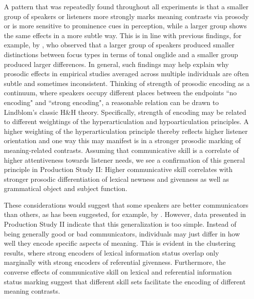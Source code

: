 A pattern that was repeatedly found throughout all experiments is that a smaller group of speakers or listeners more strongly marks meaning contrasts via prosody or is more sensitive to prominence cues in perception, while a larger group shows the same effects in a more subtle way. This is in line with previous findings, for example, by \citet{roessigDynamicsIntonationCategorical2019}, who observed that a larger group of speakers produced smaller distinctions between focus types in terms of tonal onglide and a smaller group produced larger differences. In general, such findings may help explain why prosodic effects in empirical studies averaged across multiple individuals are often subtle and sometimes inconsistent. Thinking of strength of prosodic encoding as a continuum, where speakers occupy different places between the endpoints ``no encoding" and ``strong encoding", a reasonable relation can be drawn to Lindblom's \citeyearpar{lindblomExplainingPhoneticVariation1990} classic H\&H theory. Specifically, strength of encoding may be related to different weightings of the hyperarticulation and hypoarticulation principles. A higher weighting of the hyperarticulation principle thereby reflects higher listener orientation \citep{turnbullListenerorientedPhoneticReduction2019} and one way this may manifest is in a stronger prosodic marking of meaning-related contrasts. Assuming that communicative skill is a correlate of higher attentiveness towards listener needs, we see a confirmation of this general principle in Production Study II: Higher communicative skill correlates with stronger prosodic differentiation of lexical newness and givenness as well as grammatical object and subject function. 

These considerations would suggest that some speakers are better communicators than others, as has been suggested, for example, by \citet{cangemiListenerSpecificPerceptionSpeakerSpecific2015}. However, data presented in Production Study II indicate that this generalization is too simple. Instead of being generally good or bad communicators, individuals may just differ in how well they encode specific aspects of meaning. This is evident in the clustering results, where strong encoders of lexical information status overlap only marginally with strong encoders of referential givenness. Furthermore, the converse effects of communicative skill on lexical and referential information status marking suggest that different skill sets facilitate the encoding of different meaning contrasts.

